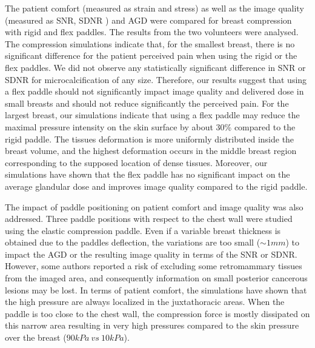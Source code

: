 The patient comfort (measured as strain and stress) as well as the image quality (measured as SNR, SDNR ) and AGD were compared for breast compression with rigid and flex paddles. The results from the two volunteers were analysed. The compression simulations indicate that, for the smallest breast, there is no significant difference for the patient perceived pain when using the rigid or the flex paddles. We did not observe any statistically significant difference in SNR or SDNR for microcalcification of any size. Therefore, our results suggest that using a flex paddle should not significantly impact image quality and delivered dose in small breasts and should not reduce significantly the perceived pain.   
For the largest breast, our simulations indicate that using a flex paddle may reduce the maximal pressure intensity on the skin surface by about 30\% compared to the rigid paddle. The tissues deformation is more uniformly distributed inside the breast volume, and the highest deformation occurs in the middle breast region corresponding to the supposed location of dense tissues. Moreover, our simulations have shown that the flex paddle has no significant impact on the average glandular dose and improves image quality compared to the rigid paddle. 

The impact of paddle positioning on patient comfort and image quality was also addressed. Three paddle positions with respect to the chest wall were studied using the elastic compression paddle. Even if a variable breast thickness is obtained due to the paddles deflection, the variations are too small ($\sim 1mm$) to impact the AGD or the resulting image quality in terms of the SNR or SDNR. However, some authors reported a risk of excluding some retromammary tissues from the imaged area, and consequently information on small posterior cancerous lesions may be lost. In terms of patient comfort, the simulations have shown that the high pressure are always localized in the juxtathoracic areas. When the paddle is too close to the chest wall, the compression force is mostly dissipated on this narrow area resulting in very high pressures compared to the skin pressure over the breast ($90kPa\ vs\ 10kPa$).
